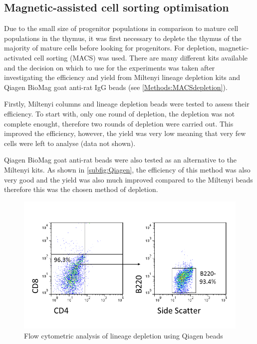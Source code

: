 \subsection{Magnetic-assisted cell sorting optimisation}

Due to the small size of progenitor populations in comparison to mature cell populations in the thymus, it was first necessary to deplete the thymus of the majority of mature cells before looking for progenitors.
For depletion, magnetic-activated cell sorting (MACS) was used.
There are many different kits available and the decision on which to use for the experiments was taken after investigating the efficiency and yield from Miltenyi lineage depletion kits and Qiagen BioMag goat anti-rat IgG beads (see \cref{Methods:MACSdepletion}).

Firstly, Miltenyi columns and lineage depletion beads were tested to assess their efficiency.
To start with, only one round of depletion, the depletion was not complete enought, therefore two rounds of depletion were carried out.
This improved the efficiency, however, the yield was very low meaning that very few cells were left to analyse (data not shown).

Qiagen BioMag goat anti-rat beads were also tested as an alternative to the Miltenyi kits. 
As shown in \cref{subfig:Qiagen}, the efficiency of this method was also very good and the yield was also much improved compared to the Miltenyi beads therefore this was the chosen method of depletion.

\begin{figure}
\includegraphics[width=\textwidth]{Figures/Qiagenbeads.png}
\caption{Flow cytometric analysis of lineage depletion using Qiagen beads}
\label{fig:Qiagenbeads}
\end{figure}

